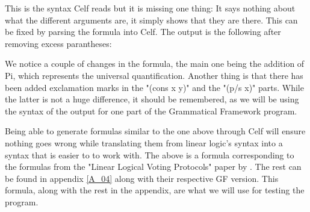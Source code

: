 This is the syntax Celf reads but it is missing one thing: It says nothing about what the different arguments are, it simply shows that they are there. This can be fixed by parsing the formula into Celf. The output is the following after removing excess parantheses:

\begin{textoform}
\end{textoform}

We notice a couple of changes in the formula, the main one being the addition of Pi, which represents the universal quantification. Another thing is that there has been added exclamation marks in the "(cons x y)" and the "(p/s x)" parts. While the latter is not a huge difference, it should be remembered, as we will be using the syntax of the output for one part of the Grammatical Framework program.

Being able to generate formulas similar to the one above through Celf will ensure nothing goes wrong while translating them from linear logic's syntax into a syntax that is easier to to work with. The above is a formula corresponding to the formulas from the "{L}inear {L}ogical {V}oting {P}rotocols"\cite{Deyoung11} paper by \citeauthor{Deyoung11}. The rest can be found in appendix \ref{A_04} along with their respective GF version. This formula, along with the rest in the appendix, are what we will use for testing the program.